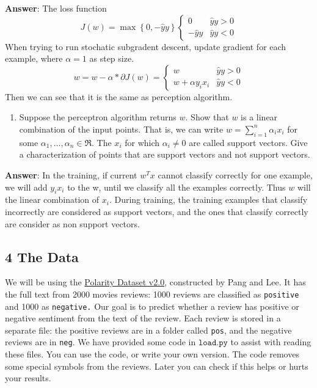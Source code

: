 \documentclass[11pt]{article}
\providecommand{\tightlist}{%
      \setlength{\itemsep}{0pt}\setlength{\parskip}{0pt}}
\begin{document}
    \textbf{Answer}: The loss function \[
J(w) = \max\left\{ 0,-\hat{y}y\right\}
\begin{cases}
  0 & \hat{y}y>0 \\
  -\hat{y}y & \hat{y}y<0
\end{cases}
\] When trying to run stochatic subgradent descent, update gradient for
each example, where \(\alpha=1\) as step size.
\[ w = w - \alpha * \partial J(w) = 
\begin{cases}
  w & \hat{y}y>0 \\
  w + \alpha y_i x_i & \hat{y}y<0
\end{cases}\] Then we can see that it is the same as perception
algorithm.

    \begin{enumerate}
\def\labelenumi{\arabic{enumi}.}
\setcounter{enumi}{2}
\tightlist
\item
  Suppose the perceptron algorithm returns \(w\). Show that \(w\) is a
  linear combination of the input points. That is, we can write
  \(w=\sum_{i=1}^{n}\alpha_{i}x_{i}\) for some
  \(\alpha_{1},\ldots,\alpha_{n}\in\Re\). The \(x_{i}\) for which
  \(\alpha_{i}\neq0\) are called support vectors. Give a
  characterization of points that are support vectors and not support
  vectors.
\end{enumerate}

    \textbf{Answer}: In the training, if current \(w^T x\) cannot classify
correctly for one example, we will add \(y_i x_i\) to the w, until we
classify all the examples correctly. Thus \(w\) will the linear
combination of \(x_i\). During training, the training examples that
classify incorrectly are considered as support vectors, and the ones
that classify correctly are consider as non support vectors.

    \hypertarget{the-data}{%
\subsection{4 The Data}\label{the-data}}

We will be using the
\href{https://www.cs.cornell.edu/people/pabo/movie-review-data}{Polarity
Dataset v2.0}, constructed by Pang and Lee. It has the full text from
2000 movies reviews: 1000 reviews are classified as \texttt{positive}
and 1000 as \texttt{negative.} Our goal is to predict whether a review
has positive or negative sentiment from the text of the review. Each
review is stored in a separate file: the positive reviews are in a
folder called \texttt{pos}, and the negative reviews are in
\texttt{neg}. We have provided some code in \(\texttt{load.py}\) to
assist with reading these files. You can use the code, or write your own
version. The code removes some special symbols from the reviews. Later
you can check if this helps or hurts your results.
\end{document}
